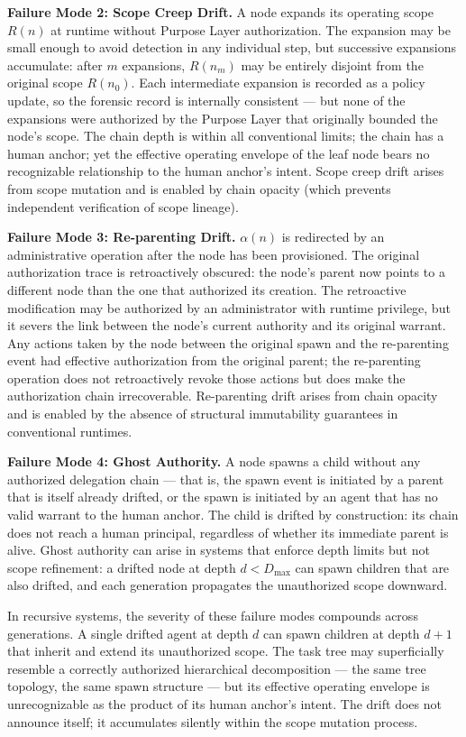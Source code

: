 \medskip
\noindent\textbf{Failure Mode 2: Scope Creep Drift.} A node expands its operating scope $R(n)$ at runtime without Purpose Layer authorization. The expansion may be small enough to avoid detection in any individual step, but successive expansions accumulate: after $m$ expansions, $R(n_m)$ may be entirely disjoint from the original scope $R(n_0)$. Each intermediate expansion is recorded as a policy update, so the forensic record is internally consistent — but none of the expansions were authorized by the Purpose Layer that originally bounded the node's scope. The chain depth is within all conventional limits; the chain has a human anchor; yet the effective operating envelope of the leaf node bears no recognizable relationship to the human anchor's intent. Scope creep drift arises from scope mutation and is enabled by chain opacity (which prevents independent verification of scope lineage).

\medskip
\noindent\textbf{Failure Mode 3: Re-parenting Drift.} $\alpha(n)$ is redirected by an administrative operation after the node has been provisioned. The original authorization trace is retroactively obscured: the node's parent now points to a different node than the one that authorized its creation. The retroactive modification may be authorized by an administrator with runtime privilege, but it severs the link between the node's current authority and its original warrant. Any actions taken by the node between the original spawn and the re-parenting event had effective authorization from the original parent; the re-parenting operation does not retroactively revoke those actions but does make the authorization chain irrecoverable. Re-parenting drift arises from chain opacity and is enabled by the absence of structural immutability guarantees in conventional runtimes.

\medskip
\noindent\textbf{Failure Mode 4: Ghost Authority.} A node spawns a child without any authorized delegation chain — that is, the spawn event is initiated by a parent that is itself already drifted, or the spawn is initiated by an agent that has no valid warrant to the human anchor. The child is drifted by construction: its chain does not reach a human principal, regardless of whether its immediate parent is alive. Ghost authority can arise in systems that enforce depth limits but not scope refinement: a drifted node at depth $d < D_{\max}$ can spawn children that are also drifted, and each generation propagates the unauthorized scope downward.

In recursive systems, the severity of these failure modes compounds across generations. A single drifted agent at depth $d$ can spawn children at depth $d+1$ that inherit and extend its unauthorized scope. The task tree may superficially resemble a correctly authorized hierarchical decomposition — the same tree topology, the same spawn structure — but its effective operating envelope is unrecognizable as the product of its human anchor's intent. The drift does not announce itself; it accumulates silently within the scope mutation process.

